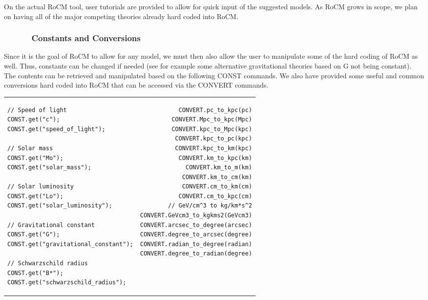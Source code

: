\documentclass[conference]{IEEEtran-modified}
\begin{document}
On the actual RoCM tool, user tutorials are provided to allow for quick input of the suggested models.  As RoCM grows in scope, we plan on having all of the major competing theories already hard coded into RoCM.


\subsubsection{\ \ \ \ \ \ Constants and Conversions}
Since it is the goal of RoCM to allow for any model, we must then also allow the user to manipulate some of the hard coding of RoCM as well.  Thus, constants can be changed if needed (see for example some alternative gravitational theories based on G not being constant). The contents can be retrieved and manipulated based on the following CONST commands. We also have provided some useful and common conversions hard coded into RoCM that can be accessed via the CONVERT commands.\begin{center}
\begin{tabular}{l !{\color{lightgray}\vrule} r}
\begin{lstlisting}
// Speed of light
CONST.get("c");
CONST.get("speed_of_light");

// Solar mass
CONST.get("Mo");
CONST.get("solar_mass");

// Solar luminosity
CONST.get("Lo");
CONST.get("solar_luminosity");

// Gravitational constant
CONST.get("G");
CONST.get("gravitational_constant");

// Schwarzschild radius
CONST.get("B*");
CONST.get("schwarzschild_radius");
\end{lstlisting}
&
\begin{lstlisting}
CONVERT.pc_to_kpc(pc)
CONVERT.Mpc_to_kpc(Mpc)
CONVERT.kpc_to_Mpc(kpc)
CONVERT.kpc_to_pc(kpc)
CONVERT.kpc_to_km(kpc)
CONVERT.km_to_kpc(km)
CONVERT.km_to_m(km)
CONVERT.km_to_cm(km)
CONVERT.cm_to_km(cm)
CONVERT.cm_to_kpc(cm)
// GeV/cm^3 to kg/km*s^2
CONVERT.GeVcm3_to_kgkms2(GeVcm3)
CONVERT.arcsec_to_degree(arcsec)
CONVERT.degree_to_arcsec(degree)
CONVERT.radian_to_degree(radian)
CONVERT.degree_to_radian(degree)
\end{lstlisting}
\end{tabular}
\end{center}

\end{document}
